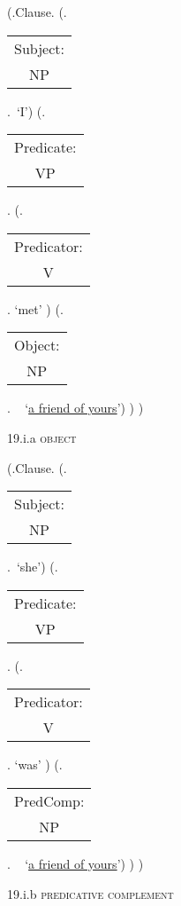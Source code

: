 \documentclass[12pt,letterpaper]{article}
\begin{document}
\clearpage
\begin{figure}
	\begin{center}
		\begin{parsetree}
			(.Clause.
			(.\begin{tabular}{c}Subject:\\NP\end{tabular}.~`I')
			(.\begin{tabular}{c}Predicate:\\VP\end{tabular}.
			(.\begin{tabular}{c}Predicator:\\V\end{tabular}. `met' )
			(.\begin{tabular}{c}Object:\\NP\end{tabular}.  ~ `\underline{a friend of yours}')
			)
			)
			
			\hfill \break\hfill \break
		\end{parsetree}
		19.i.a \textsc{object}
	\end{center}
\end{figure}


\begin{figure}
	\begin{center}
		\begin{parsetree}
			(.Clause.
			(.\begin{tabular}{c}Subject:\\NP\end{tabular}.~`she')
			(.\begin{tabular}{c}Predicate:\\VP\end{tabular}.
			(.\begin{tabular}{c}Predicator:\\V\end{tabular}. `was' )
			(.\begin{tabular}{c}PredComp:\\NP\end{tabular}.  ~ `\underline{a friend of yours}')
			)
			)
			
			\hfill \break\hfill \break
		\end{parsetree}
		19.i.b \textsc{predicative complement}
	\end{center}
\end{figure}
\end{document}

